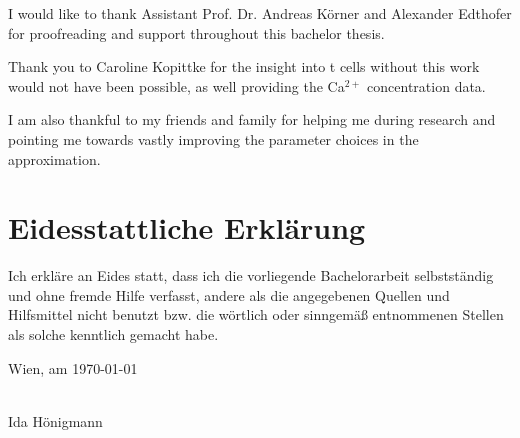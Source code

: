 \documentclass[a4paper,11pt,bibliography=totoc,listof=totoc,headinclude=true,cleardoublepage=empty]{scrbook}
\newcommand{\Calcium}{Ca\ensuremath{^{2+}}\xspace}
\begin{document}
I would like to thank Assistant Prof. Dr. Andreas Körner and Alexander Edthofer for proofreading and support throughout this bachelor thesis.

Thank you to Caroline Kopittke for the insight into t cells without this work would not have been possible, as well providing the \Calcium concentration data.

I am also thankful to my friends and family for helping me during research and pointing me towards vastly improving the parameter choices in the approximation.

\cleardoublepage

\chapter*{Eidesstattliche Erkl\"arung}
\thispagestyle{empty}
\thispagestyle{empty}

\vspace*{2cm}

Ich erkl\"are an Eides statt, dass ich die vorliegende Bachelorarbeit selbstst\"andig und ohne fremde Hilfe verfasst, andere als die angegebenen Quellen und Hilfsmittel nicht benutzt bzw. die w\"ortlich oder sinngem\"a{\ss} entnommenen Stellen als solche kenntlich gemacht habe.

\vspace*{3cm}

\noindent
Wien, am \today
%
\hfill 
%
\begin{minipage}[t]{5cm}
\centering
\underline{\hspace*{5cm}}\\
\small Ida Hönigmann
\end{minipage}

\cleardoublepage


\tableofcontents

\cleardoublepage
{} 










\listoffigures
\listoftables
\listofalgorithms

\printbibliography

\appendix


\end{document}
